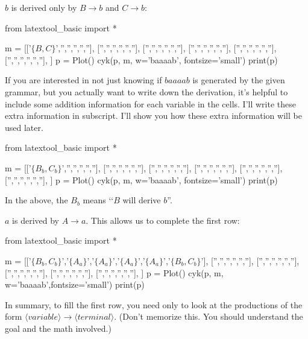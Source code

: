 $b$ is derived only by $B \rightarrow b$ and $C \rightarrow b$:
\begin{python}
from latextool_basic import *

m = [['$\{B,C\}$','','','','',''],
     ['','','','','',''],
     ['','','','','',''],
     ['','','','','',''],
     ['','','','','',''],
     ['','','','','',''],
     ]
p = Plot()
cyk(p, m, w='baaaab', fontsize='small')
print(p)
\end{python}
If you are interested in not just knowing if $baaaab$ is generated by the given grammar,
but you actually want to write down the derivation, it's helpful to include
some addition information for each variable in the cells.
I'll write these extra information in subscript.
I'll show you how these extra information will be used later.
\begin{python}
from latextool_basic import *

m = [['$\{B_b,C_b\}$','','','','',''],
     ['','','','','',''],
     ['','','','','',''],
     ['','','','','',''],
     ['','','','','',''],
     ['','','','','',''],
     ]
p = Plot()
cyk(p, m, w='baaaab', fontsize='small')
print(p)
\end{python}
In the above, the $B_b$ means \lq\lq $B$ will derive $b$''.

$a$ is derived by $A \rightarrow a$. This allows us to complete
the first row:
\begin{python}
from latextool_basic import *

m = [['$\{B_b,C_b\}$','$\{A_a\}$','$\{A_a\}$','$\{A_a\}$','$\{A_a\}$','$\{B_b,C_b\}$'],
     ['','','','','',''],
     ['','','','','',''],
     ['','','','','',''],
     ['','','','','',''],
     ['','','','','',''],
     ]
p = Plot()
cyk(p, m, w='baaaab',fontsize='small')
print(p)
\end{python}

In summary, to fill the first row, you need only to look at the
productions of the form $\langle variable \rangle \rightarrow \langle terminal
\rangle$.
(Don't memorize this. You should understand the goal and the math involved.)

